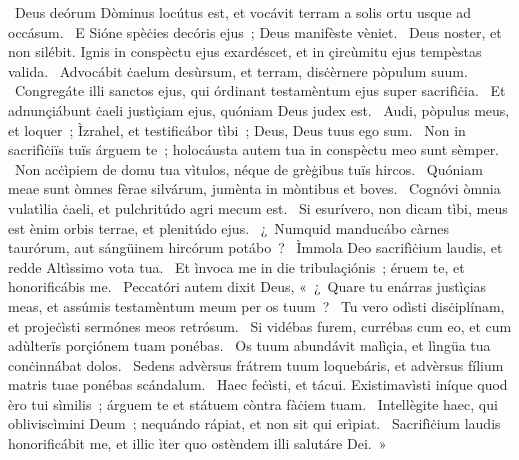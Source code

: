 ~Deus deórum Dòminus locútus est, et vocávit terram a solis ortu usque ad occásum. 
~E Sióne spèċies decóris ejus~; Deus manifèste vèniet. 
~Deus noster, et non silébit. Ignis in conspèctu ejus exardéscet, et in çircùmitu ejus tempèstas valida. 
~Advocábit ċaelum desùrsum, et terram, disċèrnere pòpulum suum. 
~Congregáte illi sanctos ejus, qui órdinant testamèntum ejus super sacrifìċia. 
~Et adnunçiábunt ċaeli justìçiam ejus, quóniam Deus judex est. 
~Audi, pòpulus meus, et loquer~; Ìzrahel, et testificábor tìbi~; Deus, Deus tuus ego sum. 
~Non in sacrifìċiïs tuïs árguem te~; holocáusta autem tua in conspèctu meo sunt sèmper. 
~Non acċìpiem de domu tua vìtulos, néque de grèġibus tuïs hircos. 
~Quóniam meae sunt òmnes fèrae silvárum, jumènta in mòntibus et boves. 
~Cognóvi òmnia vulatìlia ċaeli, et pulchritúdo agri mecum est. 
~Si esurívero, non dicam tìbi, meus est ènim orbis terrae, et plenitúdo ejus. 
~¿~Numquid manducábo càrnes taurórum, aut sángüinem hircórum potábo~? 
~Ìmmola Deo sacrifìċium laudis, et redde Altìssimo vota tua. 
~Et ìnvoca me in die tribulaçiónis~; éruem te, et honorificábis me. 
~Peccatóri autem dixit Deus, «~¿~Quare tu enárras justìçias meas, et assúmis testamèntum meum per os tuum~? 
~Tu vero odìsti disċiplínam, et projeċìsti sermónes meos retrósum. 
~Si vidébas furem, currébas cum eo, et cum adùlterïs porçiónem tuam ponébas. 
~Os tuum abundávit malìçia, et lìngüa tua conċinnábat dolos. 
~Sedens advèrsus frátrem tuum loquebáris, et advèrsus fílium matris tuae ponébas scándalum. 
~Haec feċìsti, et tácui. Existimavìsti iníque quod èro tui sìmilis~; árguem te et státuem còntra fàċiem tuam. 
~Intellègite haec, qui obliviscìmini Deum~; nequándo rápiat, et non sit qui erìpiat. 
~Sacrifìċium laudis honorificábit me, et illic ìter quo ostèndem illi salutáre Dei.~»
